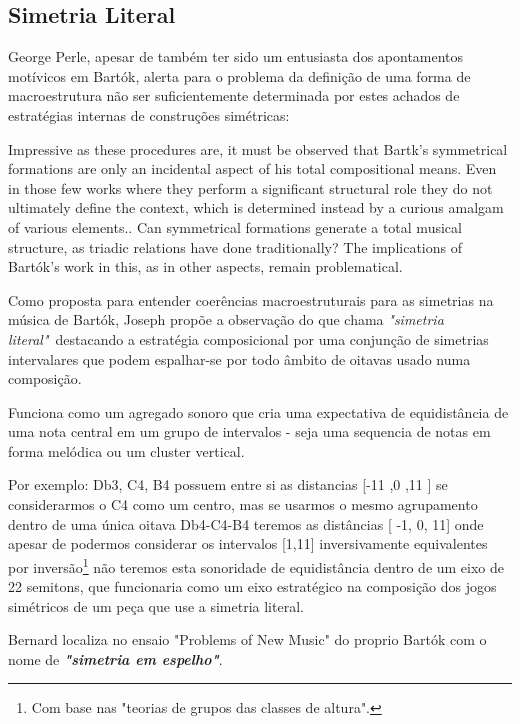 \documentclass[
	12pt,				%
	openright,			%
	twoside,			%
	a4paper,			%
	english,			%
	french,				%
	spanish,			%
	brazil				%
	]{abntex2}
\begin{document}
\subsection{Simetria Literal}


George Perle, apesar de também ter sido um entusiasta dos apontamentos motívicos em Bartók, alerta para o problema da definição de uma forma de macroestrutura não ser suficientemente determinada por estes achados de estratégias internas de construções simétricas:

\begin{citacao}
Impressive as these procedures are, it must be observed that Bartk's symmetrical formations 
are only an incidental aspect of his total compositional means. Even in those few works where they perform a significant structural role they do not ultimately define the context, which is determined
instead by a curious amalgam of various elements..
Can symmetrical formations generate a total musical structure, as triadic relations have done traditionally? The implications of Bartók's work in this, as in other aspects, remain problematical.
\end{citacao}

Como proposta para entender coerências macroestruturais para as simetrias na música de Bartók, Joseph  propõe a observação do que chama \textit{"simetria literal"}\ destacando a estratégia composicional por uma conjunção de simetrias intervalares que podem espalhar-se por todo âmbito de oitavas usado numa composição.  

Funciona como um  agregado sonoro que cria uma expectativa de equidistância de uma nota central em um grupo de intervalos - seja uma sequencia de notas em forma melódica ou um cluster vertical. 

Por exemplo: { Db3, C4, B4} possuem entre si as distancias [-11 ,0 ,11 ] se considerarmos o C4 como um centro, mas se usarmos o mesmo agrupamento dentro de uma única oitava {Db4-C4-B4} teremos as distâncias [ -1, 0, 11] onde apesar de podermos considerar os intervalos [1,11] inversivamente equivalentes por inversão\footnote{Com base nas "teorias de grupos das classes de altura".} não teremos esta sonoridade de equidistância dentro de um eixo de 22 semitons, que funcionaria como um eixo estratégico na composição dos jogos simétricos de um peça que use a simetria literal. 

Bernard localiza no ensaio "Problems of New Music" do proprio Bartók com o nome de \textit{\textbf{"simetria em espelho"}}.
\end{document}
